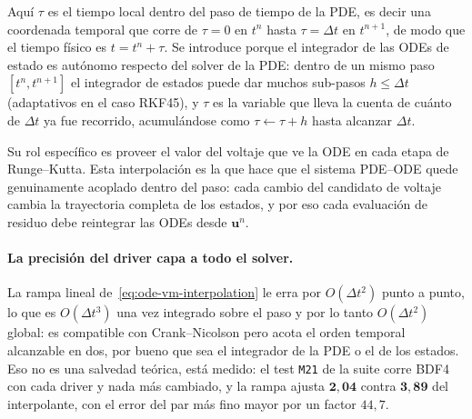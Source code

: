 \documentclass[11pt,a4paper]{article}
\newcommand{\code}[1]{\texttt{\small #1}}
\begin{document}
Aquí $\tau$ es el tiempo local dentro del paso de tiempo de la PDE, es decir una coordenada temporal que corre de $\tau=0$ en $t^n$ hasta $\tau=\Delta t$ en $t^{n+1}$, de modo que el tiempo físico es $t=t^n+\tau$. Se introduce porque el integrador de las ODEs de estado es autónomo respecto del solver de la PDE: dentro de un mismo paso $[t^n,t^{n+1}]$ el integrador de estados puede dar muchos sub-pasos $h\le\Delta t$ (adaptativos en el caso RKF45), y $\tau$ es la variable que lleva la cuenta de cuánto de $\Delta t$ ya fue recorrido, acumulándose como $\tau\leftarrow\tau+h$ hasta alcanzar $\Delta t$.

Su rol específico es proveer el valor del voltaje que ve la ODE en cada etapa de
Runge--Kutta. Esta interpolación es la que hace que el sistema PDE--ODE quede genuinamente
acoplado dentro del paso: cada cambio del candidato de voltaje cambia la trayectoria completa
de los estados, y por eso cada evaluación de residuo debe reintegrar las ODEs desde
$\mathbf{u}^n$.

\paragraph{La precisión del driver capa a todo el solver.} La rampa lineal
de~\eqref{eq:ode-vm-interpolation} le erra por $O(\Delta t^2)$ punto a punto, lo que es
$O(\Delta t^3)$ una vez integrado sobre el paso y por lo tanto $O(\Delta t^2)$ global: es
compatible con Crank--Nicolson pero acota el orden temporal alcanzable en dos, por bueno que
sea el integrador de la PDE o el de los estados. Eso no es una salvedad teórica, está
medido: el test \code{M21} de la suite corre BDF4 con cada driver y nada más cambiado, y la
rampa ajusta $\mathbf{2{,}04}$ contra $\mathbf{3{,}89}$ del interpolante, con el error del
par más fino mayor por un factor $44{,}7$.
\end{document}
